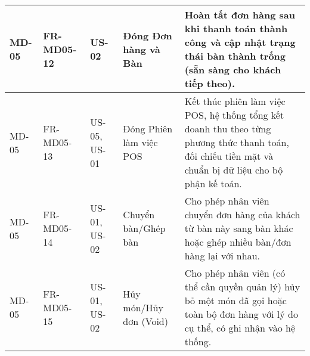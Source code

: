 \begin{longtable}{|m{2cm}|m{2.5cm}|m{2.5cm}|m{4.5cm}|m{4cm}|}
\hline
MD-05 & FR-MD05-12 & US-02 & Đóng Đơn hàng và Bàn & Hoàn tất đơn hàng sau khi thanh toán thành công và cập nhật trạng thái bàn thành trống (sẵn sàng cho khách tiếp theo). \\
\hline
MD-05 & FR-MD05-13 & US-05, US-01 & Đóng Phiên làm việc POS & Kết thúc phiên làm việc POS, hệ thống tổng kết doanh thu theo từng phương thức thanh toán, đối chiếu tiền mặt và chuẩn bị dữ liệu cho bộ phận kế toán. \\
\hline
MD-05 & FR-MD05-14 & US-01, US-02 & Chuyển bàn/Ghép bàn & Cho phép nhân viên chuyển đơn hàng của khách từ bàn này sang bàn khác hoặc ghép nhiều bàn/đơn hàng lại với nhau. \\
\hline
MD-05 & FR-MD05-15 & US-01, US-02 & Hủy món/Hủy đơn (Void) & Cho phép nhân viên (có thể cần quyền quản lý) hủy bỏ một món đã gọi hoặc toàn bộ đơn hàng với lý do cụ thể, có ghi nhận vào hệ thống. \\
\hline

\end{longtable}
